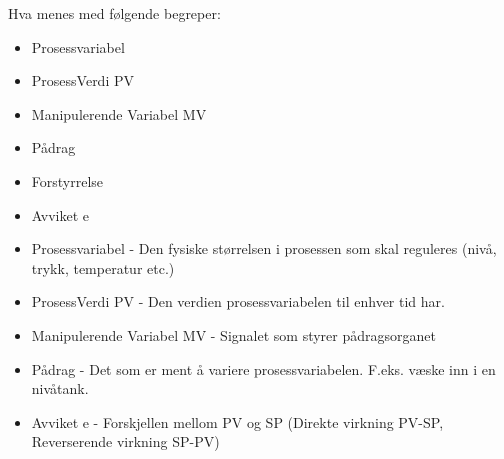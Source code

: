 

Hva menes med følgende begreper:

\begin{itemize}
\item Prosessvariabel
\item ProsessVerdi PV 
\item Manipulerende Variabel MV
\item Pådrag 
\item Forstyrrelse 
\item Avviket e 
\end{itemize}









\begin{itemize}
\item Prosessvariabel - Den fysiske størrelsen i prosessen som skal reguleres (nivå, trykk, temperatur etc.)
\item ProsessVerdi PV - Den verdien prosessvariabelen til enhver tid har.
\item Manipulerende Variabel MV - Signalet som styrer pådragsorganet
\item Pådrag - Det som er ment å variere prosessvariabelen. F.eks. væske inn i en nivåtank. 
\item Avviket e - Forskjellen mellom PV og SP (Direkte virkning PV-SP, Reverserende virkning SP-PV)
\end{itemize}











